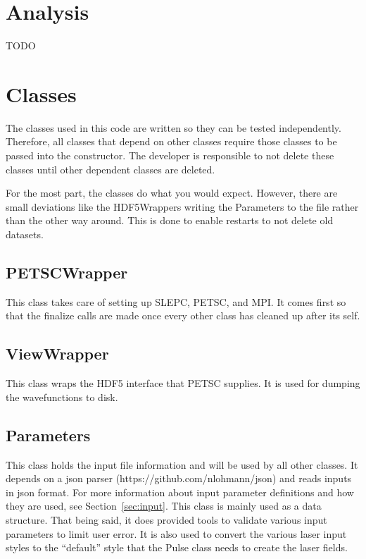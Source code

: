 \documentclass{article}
\begin{document}

\section{Analysis} %
\label{sec:analysis}
TODO



\section{Classes} %
\label{sec:classes}

The classes used in this code are written so they can be tested independently. Therefore, all classes that depend on other classes require those classes to be passed into the constructor. The developer is responsible to not delete these classes until other dependent classes are deleted.

For the most part, the classes do what you would expect. However, there are small deviations like the HDF5Wrappers writing the Parameters to the file rather than the other way around. This is done to enable restarts to not delete old datasets.

\subsection{PETSCWrapper} %
\label{sub:petscwrapper}
This class takes care of setting up SLEPC, PETSC, and MPI. It comes first so that the finalize calls are made once every other class has cleaned up after its self.

\subsection{ViewWrapper} %
\label{sub:viewwrapper}
This class wraps the HDF5 interface that PETSC supplies. It is used for dumping the wavefunctions to disk.

\subsection{Parameters} %
\label{sub:parameters}
This class holds the input file information and will be used by all other classes. It depends on a json parser (https://github.com/nlohmann/json) and reads inputs in json format. For more information about input parameter definitions and how they are used, see Section~\ref{sec:input}. This class is mainly used as a data structure. That being said, it does provided tools to validate various input parameters to limit user error. It is also used to convert the various laser input styles to the ``default'' style that the Pulse class needs to create the laser fields.
\end{document}
